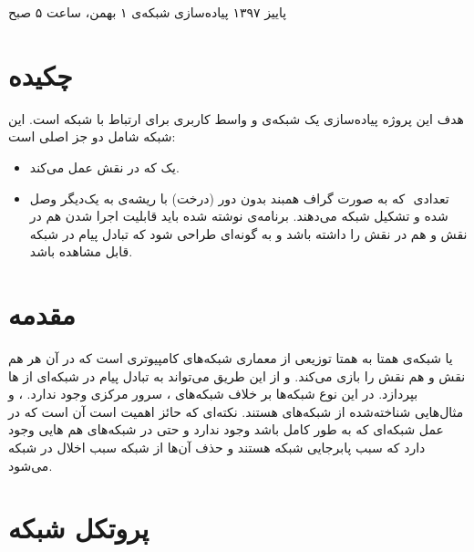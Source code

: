 \documentclass{article}
\begin{document}
    \handout
    {}
    {}
    {پاییز ۱۳۹۷}
    {پیاده‌سازی شبکه‌ی }
    {۱ بهمن، ساعت ۵ صبح}
    
    \vspace{0.3cm}
     
\section{چکیده}

   هدف این پروژه پیاده‌سازی یک شبکه‌ی  و واسط کاربری برای ارتباط با شبکه است.  این شبکه شامل دو جز اصلی است: 

\begin{itemize}
   \item   	یک  که در نقش  عمل می‌کند.

\item تعدادی ‌ که به صورت گراف همبند بدون دور (درخت) با ریشه‌ی  به یک‌دیگر وصل شده و تشکیل شبکه می‌دهند.
   برنامه‌ی نوشته شده باید قابلیت اجرا شدن هم در نقش  و هم در نقش  را داشته باشد و به گونه‌ای طراحی شود که تبادل پیام در شبکه قابل مشاهده باشد.
\end{itemize}
 



\section{مقدمه}
 یا شبکه‌ی همتا به همتا توزیعی از معماری شبکه‌های کامپیوتری است که در آن هر  هم نقش  و هم نقش  را بازی می‌کند. و از این طریق می‌تواند به تبادل پیام در شبکه‌ای از ها بپردازد. در این نوع شبکه‌ها بر خلاف شبکه‌های ، سرور مرکزی وجود ندارد. ،  و  مثال‌هایی شناخته‌شده از شبکه‌های  هستند. نکته‌ای که حائز اهمیت است آن است که در عمل شبکه‌ای که به طور کامل  باشد وجود ندارد و حتی در شبکه‌های  هم هایی وجود دارد که سبب پابرجایی شبکه هستند و حذف آن‌ها از شبکه سبب اخلال در شبکه می‌شود.



\section{پروتکل شبکه}
\end{document}
